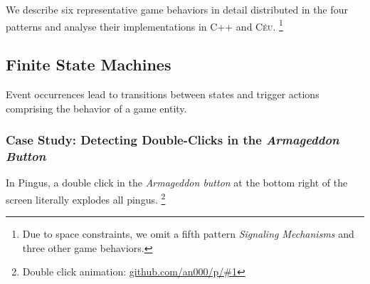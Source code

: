 \documentclass{vgtc}                          %
\newcommand{\CEU}{\textsc{C\'{e}u}\xspace}
\begin{document}
We describe six representative game behaviors in detail distributed in the four
patterns and analyse their implementations in C++ and \CEU.%
\footnote{Due to space constraints, we omit a fifth pattern
\emph{Signaling Mechanisms} and three other game behaviors.}

\subsection{Finite State Machines}
\label{sec.pats.fsms}

    Event occurrences lead to transitions between states and trigger actions
    comprising the behavior of a game entity.

\subsubsection{Case Study: Detecting Double-Clicks in the \emph{Armageddon Button}}


In Pingus, a double click in the \emph{Armageddon button} at the bottom right
of the screen literally explodes all pingus.%
\footnote{Double click animation: \url{github.com/an000/p/#1} }
\end{document}
